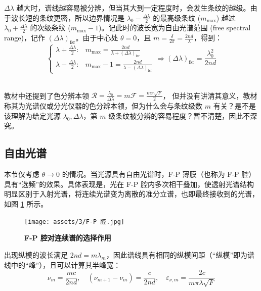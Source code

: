 \documentclass[UTF8]{report}
\theoremstyle{MyLineTheoremStyle} %
\theoremstyle{MyBlockTheoremStyle} %
\theoremstyle{MySubsubsectionStyle} %
\begin{document}
$\Delta \lambda$ 越大时，谱线越容易被分辨，但当其大到一定程度时，会发生条纹的越级。由于波长短的条纹更密，所以边界情况是 $ \lambda_0 - \frac{\Delta \lambda}{2}$ 的最高级条纹 ($m_{\max}$) 越过 $ \lambda_0 + \frac{\Delta \lambda}{2}$ 的次级条纹 ($m_{\max} - 1$)。记此时的波长宽为自由光谱范围 (free spectral range)，记作 $\left(\Delta \lambda\right)_{\text{fsr}}$。由于中心处 $\theta = 0$，且 $m = \frac{\delta}{2\pi} = \frac{2 nd }{\lambda}$，得到：
\begin{equation}
\begin{cases}
    \lambda + \frac{\Delta \lambda}{2}: & m_{\max} = \frac{2 n d}{\lambda + \left(\Delta \lambda\right)_{\text{fsr}}} 
    \\ 
    \lambda - \frac{\Delta \lambda}{2}: & m_{\max} - 1 = \frac{2 n d}{\lambda - \left(\Delta \lambda\right)_{\text{fsr}}}
\end{cases}\Longrightarrow 
\left(\Delta \lambda\right)_{\text{fsr}} = \frac{\lambda_0^2}{2 n d}
\end{equation}


~\\

教材中还提到了色分辨本领 $\mathscr{R} = \frac{\lambda_0}{\Delta \lambda} = m \mathscr{F} = \frac{m \pi \sqrt{F} }{2}$，
但并没有讲清其意义，教材称其为光谱仪或分光仪器的色分辨本领，但为什么会与条纹级数 $m$ 有关？是不是该理解为给定光源 $\lambda_0, \Delta \lambda$，第 $m$ 级条纹被分辨的容易程度？暂不清楚，因此不深究。


\subsection{自由光谱}

本节仅考虑 $\theta \to 0$ 的情况。当光源具有自由光谱时，F-P 薄膜（也称为 F-P 腔）具有“选频”的效果。具体表现是，光在 F-P 腔内多次相干叠加，使透射光谱结构明显区别于入射光谱，将连续光谱变为离散的准分立谱，也即最终接收到的光谱，如图 \ref{F-P 腔对连续谱的选择作用} 所示。
\begin{figure}[H]\centering
\texttt{[image: assets/3/F-P 腔.jpg]}
\caption{\bfseries F-P 腔对连续谱的选择作用}\label{F-P 腔对连续谱的选择作用}
\end{figure}
出现纵模的波长满足 $2nd = m\lambda_m$，因此谱线具有相同的纵模间距（“纵模”即为谱线中的“峰”），且可以计算其半峰宽：
\begin{equation}
\nu_m = \frac{mc}{2nd},\quad (\nu_{m+1} - \nu_m) = \frac{c}{2nd},\quad \varepsilon_{\nu, m} = \frac{2c}{m \pi \lambda\sqrt{F}}
\end{equation}
\end{document}
